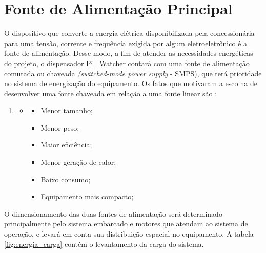\section{Fonte de Alimentação Principal} \label{section:energia_fonte}

 
 O dispositivo que converte a energia elétrica disponibilizada pela concessionária para uma tensão, corrente e frequência exigida por algum eletroeletrônico é a fonte de alimentação. Desse modo, a fim de atender as necessidades energéticas do projeto, o dispensador Pill Watcher contará com uma fonte de alimentação comutada ou chaveada \textit{(switched-mode power supply} - SMPS), que terá prioridade no sistema de energização do equipamento. Os fatos que motivaram a escolha de desenvolver uma fonte chaveada em relação a uma fonte linear são \cite{Projeto_fonte}:
 
 \begin{enumerate}
    \item[ ]
    \begin{itemize}
        \item[ ]
        \begin{itemize}
            \item Menor tamanho;
            \item Menor peso;
            \item Maior eficiência;
            \item Menor geração de calor;
            \item Baixo consumo;
            \item Equipamento mais compacto;
        \end{itemize}
    \end{itemize}
\end{enumerate}

O dimensionamento das duas fontes de alimentação será determinado principalmente pelo sistema embarcado e motores que atendam ao sistema de operação, e levará em conta sua distribuição espacial no equipamento. A tabela \ref{fig:energia_carga} contém o levantamento da carga do sistema.

 
